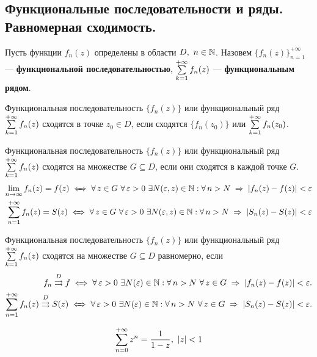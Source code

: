 	\subsection{Функциональные последовательности и ряды.\\ Равномерная сходимость.}
	\begin{definition}
		Пусть функции $f_n(z)$ определены в области $D,\ n\in\mathbb{N}$. Назовем 
	$\{f_n(z)\}_{n=1}^{+\infty}$ --- \textbf{функциональной последовательностью},
	$\sum\limits_{k=1}^{+\infty}f_n(z)$ --- \textbf{функциональным рядом}.
	\end{definition}
	\begin{definition}
		Функциональная последовательность $\{f_n(z)\}$ или функциональный ряд $\sum\limits_{k=1}^{+\infty}f_n(z)$ сходятся в точке $z_0\in D$, если сходятся $\{f_n(z_0)\}$ или $\sum\limits_{k=1}^{+\infty}f_n(z_0)$.
	\end{definition}
	\begin{definition}
		Функциональная последовательность $\{f_n(z)\}$ или функциональный ряд $\sum\limits_{k=1}^{+\infty}f_n(z)$ сходятся на множестве $G\subseteq D$, если они сходятся в каждой точке $G$.
		\begin{align*}
			\Lim_{n\to\infty}f_n(z) = f(z)\iff\forall\,z\in G\ \forall\,\epsilon>0\ \exists N(\epsilon,z)\in\N: \forall\,n>N\implies |f_n(z)- f(z)|<\epsilon\\
			\Sum_{n=1}^{+\infty}f_n(z) = S(z)\iff \forall\,z\in G\ \forall\,\epsilon>0\ \exists N(\epsilon,z)\in\N: \forall\,n>N\implies |S_n(z)- S(z)|<\epsilon
		\end{align*} 
	\end{definition}
	\begin{definition}
		Функциональная последовательность $\{f_n(z)\}$ или функциональный ряд $\sum\limits_{k=1}^{+\infty}f_n(z)$ сходятся на множестве $G\subseteq D$ равномерно, если 
		\begin{align*}
			f_n\overset{D}\rightrightarrows f\iff \forall\,\epsilon>0\ \exists N(\epsilon)\in\N: \forall\,n>N\ \forall\,z\in G\implies |f_n(z)- f(z)|<\epsilon.\\
			\Sum_{n=1}^{+\infty}f_n(z)\overset{D}\rightrightarrows S(z)\iff\forall\,\epsilon>0\ \exists N(\epsilon)\in\N: \forall\,n>N\ \forall\,z\in G\implies |S_n(z)- S(z)|<\epsilon.
		\end{align*}
	\end{definition}
	\begin{statement*}
		\[ \sum\limits_{n=0}^{+\infty}z^n = \frac{1}{1-z},\ |z|<1 \]
	\end{statement*}

